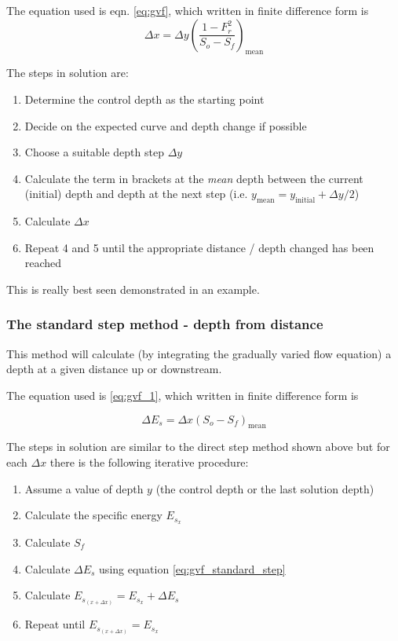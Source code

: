 \documentclass[a4paper, 12pt, british]{article} %
\numberwithin{equation}{section}
\numberwithin{figure}{section}
\numberwithin{table}{section}
\begin{document}
The equation used is eqn. \ref{eq:gvf}, which written in finite difference form is
\begin{equation}
\Delta x = \Delta y \left(\frac{1 - F_r^2}{S_o-S_f}\right)_\text{mean}
\label{eq:gvf_direct_step} %
\end{equation}

\newpage 
The steps in solution are:
\begin{enumerate}[noitemsep]
	\item 	Determine the control depth as the starting point
\item 	Decide on the expected curve and depth change if possible
\item 	Choose a suitable depth step $\Delta y$
\item 	Calculate the term in brackets at the \textit{mean} depth between the current (initial) depth and depth at the next step  (i.e. $y_\text{mean} = y_\text{initial} + \Delta y/2$)
\item 	Calculate $\Delta x$
\item 	Repeat 4 and 5 until the appropriate distance / depth changed has been reached
\end{enumerate}
This is really best seen demonstrated in an example.

\subsubsection{The standard step method - depth from distance} 

This method will calculate (by integrating the gradually varied flow equation) a depth at a given distance up or downstream.

The equation used is \ref{eq:gvf_1}, which written in finite difference form is

\begin{equation}
\Delta E_s = \Delta x (S_o-S_f)_\text{mean}
\label{eq:gvf_standard_step} %
\end{equation} 


The steps in solution are similar to the direct step method shown above but for each $\Delta x$ there is the following iterative procedure:
\begin{enumerate}[noitemsep]
\item	Assume a value of depth $y$ (the control depth or the last solution depth)
\item	Calculate the specific energy $E_{s_x}$
\item	Calculate $S_f$
\item	Calculate $\Delta E_s$ using equation \ref{eq:gvf_standard_step}
\item	Calculate $E_{s_{(x+\Delta x)}} = E_{s_x} + \Delta E_s$
\item	Repeat until $E_{s_{(x+\Delta x)}}  = E_{s_x}$
\end{enumerate}
\end{document}
